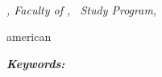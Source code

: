 {%
    
    \begin{center}
        \namaMahasiswa \\
        \texttt{\emailref{\emailKorespondensi}}
        
        \textit{\textbf{\MakeUppercase{\judulENG}}}
        
        \textit{\daerahKampus, Faculty of \fakultasENG, \prodiENG\ Study Program, \tahun}
    \end{center}
    
    \vspace{0.4cm}
    
    \begin{otherlanguage*}{american}
    \noindent\textit{\abstrakENG}
    
    \vspace{0.4cm}
    
    \noindent\textit{\textbf{Keywords:} \kataKunciENG}
    \end{otherlanguage*}
}

